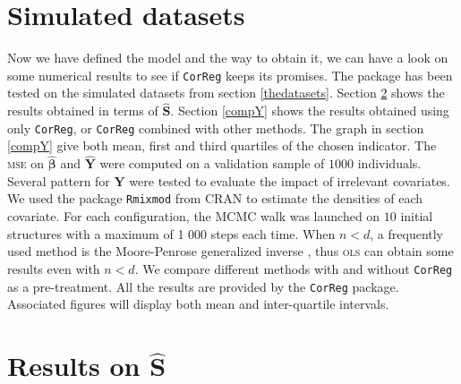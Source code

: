 \documentclass[12pt,a4paper]{report}
\begin{document}
	\section{Simulated datasets}	
	Now we have defined the model and the way to obtain it, we can have a look on some numerical results to see if {\tt CorReg} 	keeps its promises.
	The package has been tested on the simulated datasets from section \ref{thedatasets}.
Section \ref{compZ} shows the results obtained in terms of $\hat{\boldsymbol{S}}$. Section \ref{compY} shows the results obtained using only {\tt CorReg}, or {\tt CorReg} combined with other methods. The graph in section \ref{compY} give both mean, first and third quartiles of the chosen indicator. The \textsc{mse} on $\hat{\boldsymbol{\beta}}$ and $\hat{\boldsymbol{Y}}$ were computed on a validation sample of $1 000$ individuals. Several pattern for $\boldsymbol{Y}$ were tested to evaluate the impact of irrelevant covariates.\\

	We used the package { \tt Rmixmod} from CRAN \cite{packageRmixmod} to estimate the densities of each covariate. For each configuration, the MCMC walk was launched on $10$ initial structures with a maximum of 1 000 steps each time.
	When $n<d$, a frequently used method is the Moore-Penrose generalized inverse \cite{katsikis2008fast}, thus \textsc{ols} can obtain some results even with $n<d$. %
	We compare different methods with and without {\tt CorReg} as a pre-treatment. All the results are provided by the {\tt CorReg} package. Associated figures will display both mean and inter-quartile intervals.
	
		\section{Results on $\hat{\boldsymbol{S}}$}	\label{compZ}
\end{document}
